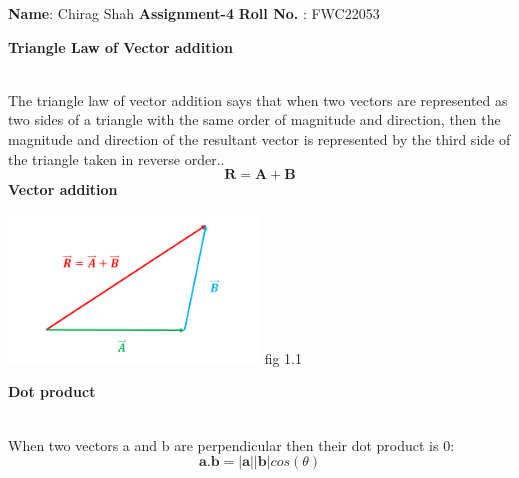 \documentclass[10pt,a4paper]{report}
\begin{document}
\raggedright \textbf{Name}:\hspace{1mm} Chirag Shah\hspace{3cm} \Large \textbf{Assignment-4}\hspace{2.5cm} %
\normalsize \textbf{Roll No.} :\hspace{1mm} FWC22053\vspace{1cm}
\begin{multicols}{2}

\textbf{Triangle Law of Vector addition }
\vspace{0.5cm}\raggedright \\
The triangle law of vector addition says that when two vectors are represented as two sides of a triangle with the same order of magnitude and direction, then the magnitude and direction of the resultant vector is represented by the third side of the triangle taken in reverse order..\vspace{3mm} \\ 
\begin{equation}
\boldsymbol{R}=\boldsymbol{A}+\boldsymbol{B} 
\end{equation}
\vspace{2mm}\textbf{Vector addition }
 \begin{center}
 \includegraphics[width=0.5\textwidth]{tri.png}  
 fig 1.1   \vspace{2mm}\\
 \end{center}\vspace{5mm}
\textbf{Dot product}\vspace{1mm}
\raggedright \\When two vectors a and b are perpendicular then their dot product is 0:\vspace{3mm} 
\begin{equation}
\boldsymbol{a}.\boldsymbol{b}=\boldsymbol{|a|}\boldsymbol{|b|}cos(\theta)
\end{equation}
\vspace{2mm}

\end{multicols}
\end{document}
